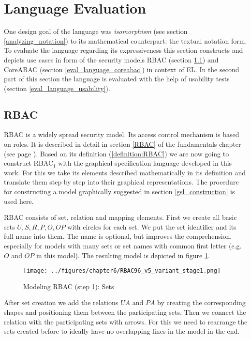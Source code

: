 \documentclass[twoside, openright, 12pt]{book}
\begin{document}
\section{Language Evaluation}
\label{eval_language}
One design goal of the language was \textit{isomorphism} (see section \ref{analyzing_notation}) to its mathematical counterpart: the textual notation form.
To evaluate the language regarding its expressiveness this section constructs and depicts use cases in form of the security models RBAC (section \ref{eval_language_rbac}) and CoreABAC (section \ref{eval_language_coreabac}) in context of EL.
In the second part of this section the language is evaluated with the help of usability tests (section \ref{eval_language_usability}).



\subsection{RBAC}
\label{eval_language_rbac}
RBAC is a widely spread security model.
Its access control mechanism is based on roles.
It is described in detail in section \ref{RBAC} of the fundamentals chapter (see page \pageref{RBAC}).
Based on its definition (\ref{definition:RBAC}) we are now going to construct RBAC$_1$ with the graphical specification language developed in this work.
For this we take its elements described mathematically in its definition and translate them step by step into their graphical representations.
The procedure for constructing a model graphically suggested in section \ref{gsl_construction} is used here.

RBAC consists of set, relation and mapping elements.
First we create all basic sets $U, S, R, P, O, \mathit{OP}$ with circles for each set.
We put the set identifier and its full name into them.
The name is optional, but improves the comprehension, especially for models with many sets or set names with common first letter (e.g.\ $O$ and $\mathit{OP}$ in this model).
The resulting model is depicted in figure \ref{fig:RBAC96_v5_variant_stage1}.

\begin{figure}[htb]
	\centering
	\texttt{[image: ../figures/chapter6/RBAC96\_v5\_variant\_stage1.png]}
	\caption{Modeling RBAC (step 1): Sets}
	\label{fig:RBAC96_v5_variant_stage1}
\end{figure}

\noindent
After set creation we add the relations $UA$ and $PA$ by creating the corresponding shapes and positioning them between the participating sets.
Then we connect the relation with the participating sets with arrows.
For this we need to rearrange the sets created before to ideally have no overlapping lines in the model in the end.
\end{document}
